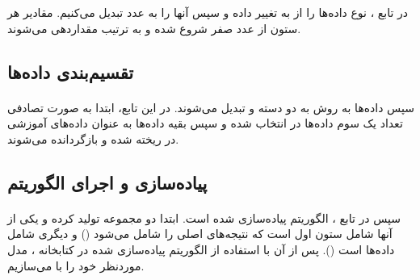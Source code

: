 \documentclass[a4paper,12pt]{article}
\begin{document}
در تابع ، نوع داده‌ها را از  به  تغییر داده و سپس آنها را به عدد تبدیل می‌کنیم. مقادیر هر ستون از عدد صفر شروع شده و به ترتیب مقداردهی می‌شوند.

\begin{flushleft}
\end{flushleft}

\subsection{تقسیم‌بندی داده‌ها}	
\paragraph{}
سپس داده‌ها به روش  به دو دسته  و  تبدیل می‌شوند. در این تابع، ابتدا به صورت تصادفی تعداد یک سوم داده‌ها در  انتخاب شده و سپس بقیه داده‌ها به عنوان داده‌های آموزشی در  ریخته شده و بازگردانده می‌شوند.
\begin{flushleft}
\end{flushleft}

\subsection{پیاده‌سازی و اجرای الگوریتم}
\paragraph{}
سپس در تابع ، الگوریتم  پیاده‌سازی شده است. ابتدا دو مجموعه تولید کرده و یکی از آنها شامل ستون اول است که نتیجه‌های اصلی را شامل می‌شود () و دیگری شامل داده‌ها است (). پس از آن با استفاده از الگوریتم  پیاده‌سازی شده در کتابخانه ، مدل موردنظر خود را با  می‌سازیم.
	
\end{document}
